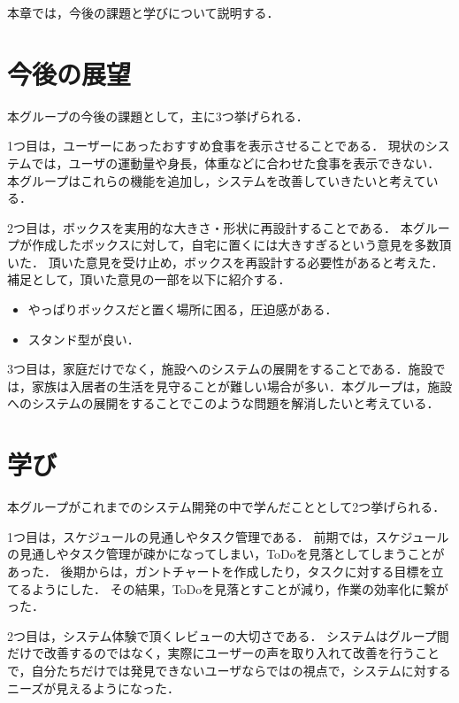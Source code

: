 \documentclass[../report]{subfiles}
\begin{document}
本章では，今後の課題と学びについて説明する．

\section{今後の展望}
本グループの今後の課題として，主に3つ挙げられる．

1つ目は，ユーザーにあったおすすめ食事を表示させることである．
現状のシステムでは，ユーザの運動量や身長，体重などに合わせた食事を表示できない．
本グループはこれらの機能を追加し，システムを改善していきたいと考えている．

2つ目は，ボックスを実用的な大きさ・形状に再設計することである．
本グループが作成したボックスに対して，自宅に置くには大きすぎるという意見を多数頂いた．
頂いた意見を受け止め，ボックスを再設計する必要性があると考えた．
補足として，頂いた意見の一部を以下に紹介する．

\begin{itemize}
    \item やっぱりボックスだと置く場所に困る，圧迫感がある．
    \item スタンド型が良い．
\end{itemize}

3つ目は，家庭だけでなく，施設へのシステムの展開をすることである．施設では，家族は入居者の生活を見守ることが難しい場合が多い．本グループは，施設へのシステムの展開をすることでこのような問題を解消したいと考えている．

\section{学び}
本グループがこれまでのシステム開発の中で学んだこととして2つ挙げられる．

1つ目は，スケジュールの見通しやタスク管理である．
前期では，スケジュールの見通しやタスク管理が疎かになってしまい，ToDoを見落としてしまうことがあった．
後期からは，ガントチャートを作成したり，タスクに対する目標を立てるようにした．
その結果，ToDoを見落とすことが減り，作業の効率化に繋がった．

2つ目は，システム体験で頂くレビューの大切さである．
システムはグループ間だけで改善するのではなく，実際にユーザーの声を取り入れて改善を行うことで，自分たちだけでは発見できないユーザならではの視点で，システムに対するニーズが見えるようになった．
\end{document}

